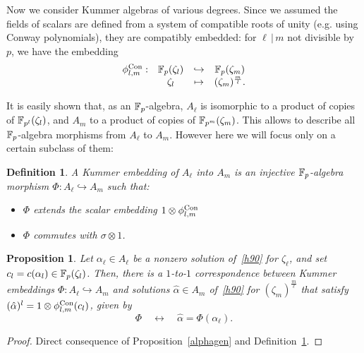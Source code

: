 \documentclass{sig-alternate}
\newtheorem{proposition}[theorem]{Proposition}
\newtheorem{definition}[theorem]{Definition}
\begin{document}
Now we consider Kummer algebras of various degrees.
Since we assumed the fields of scalars are defined from a system
of compatible roots of unity (e.g. using Conway polynomials),
they are compatibly embedded:
for $\ell\,|\,m$ not divisible by $p$, we have the embedding
\[
\begin{array}{cccc}
  {\phi^{\textrm{Con}}_{{l},{m}}}: & \mathbb{F}_{p}(\zeta_l) & \hookrightarrow & \mathbb{F}_{p}(\zeta_m) \\
  & \zeta_l & \mapsto & (\zeta_{m})^{\frac{m}{l}}.
\end{array}
\]

It is easily shown that, as an $\mathbb{F}_{p}$-algebra, $A_\ell$ is isomorphic to a product of copies of $\mathbb{F}_{p^l}(\zeta_l)$,
and $A_m$ to a product of copies of $\mathbb{F}_{p^m}(\zeta_m)$.
This allows to describe all $\mathbb{F}_{p}$-algebra morphisms from $A_\ell$ to $A_m$. However here we will focus only on a certain
subclass of them:
\begin{definition}
\label{Kembedding}
A \emph{Kummer embedding} of $A_\ell$ into $A_m$ is an \emph{injective} $\mathbb{F}_{p}$-algebra morphism $\Phi:A_\ell\hookrightarrow A_m$
such that:
\begin{itemize}
\item $\Phi$ extends the scalar embedding $1\otimes{\phi^{\textrm{Con}}_{{l},{m}}}$
\item $\Phi$ commutes with $\sigma\otimes1$.
\end{itemize}
\end{definition}

\begin{proposition}
\label{Phialpha}
Let $\alpha_\ell\in A_\ell$ be a nonzero solution of~\eqref{h90} for $\zeta_\ell$, and set $c_l=c(\alpha_l)\in\mathbb{F}_{p}(\zeta_l)$.
Then, there is a $1$-to-$1$ correspondence between Kummer embeddings $\Phi:A_\ell\hookrightarrow A_m$ and solutions $\hat{\alpha}\in A_m$
of~\eqref{h90} for $(\zeta_m)^{\frac{m}{\ell}}$ that satisfy $(\hat{\alpha})^l=1\otimes{\phi^{\textrm{Con}}_{{l},{m}}}(c_l)$,
given by \[ \Phi\quad\longleftrightarrow\quad\hat{\alpha}=\Phi(\alpha_\ell). \]
\end{proposition}
\begin{proof}
Direct consequence of Proposition~\ref{alphagen} and Definition~\ref{Kembedding}.
\end{proof}
\end{document}

